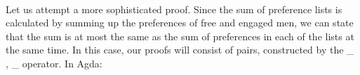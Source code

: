 {\begin{code}
\>[0]%
\>[1476I]\AgdaSymbol{(}\AgdaSpace{}%
\AgdaOperator{\AgdaInductiveConstructor{,}}\AgdaSpace{}%
\AgdaInductiveConstructor{[]}\AgdaSymbol{)}\<%
\\
\>[.][@{}l@{}]\<[1476I]%
\>[20]\AgdaSymbol{((}\AgdaSpace{}%
\AgdaOperator{\AgdaInductiveConstructor{,}}\AgdaSpace{}%
\AgdaSpace{}%
\AgdaSpace{}%
\AgdaSymbol{)}\AgdaSpace{}%
\AgdaSpace{}%
\AgdaSymbol{)}\<%
\\
%
\>[20]\AgdaSpace{}%
\AgdaSymbol{=}\AgdaSpace{}%
\AgdaSpace{}%
\AgdaSpace{}%
\AgdaSymbol{(}\AgdaSpace{}%
\AgdaSymbol{(}\AgdaSpace{}%
\AgdaSymbol{((}\AgdaSpace{}%
\AgdaOperator{\AgdaInductiveConstructor{,}}\AgdaSpace{}%
\AgdaSymbol{)}\AgdaSpace{}%
\AgdaSpace{}%
\AgdaSymbol{)))}\<%
\\
\>[0]%
\>[1495I]\AgdaSymbol{(}\AgdaSpace{}%
\AgdaOperator{\AgdaInductiveConstructor{,}}\AgdaSpace{}%
\AgdaSpace{}%
\AgdaSpace{}%
\AgdaSymbol{)}\<%
\\
\>[.][@{}l@{}]\<[1495I]%
\>[20]\AgdaSymbol{((}\AgdaSpace{}%
\AgdaOperator{\AgdaInductiveConstructor{,}}\AgdaSpace{}%
\AgdaSpace{}%
\AgdaSpace{}%
\AgdaSymbol{)}\AgdaSpace{}%
\AgdaSpace{}%
\AgdaSymbol{)}\<%
\\
%
\>[20]\AgdaSpace{}%
\AgdaSymbol{=}\AgdaSpace{}%
\AgdaSpace{}%
\AgdaSymbol{(}\AgdaSpace{}%
\AgdaSymbol{(}\AgdaSpace{}%
\AgdaSpace{}%
\AgdaOperator{\AgdaPrimitive{+}}\AgdaSpace{}%
\AgdaSpace{}%
\AgdaSymbol{))}\AgdaSpace{}%
\AgdaSpace{}%
\AgdaSymbol{(}\AgdaSpace{}%
\AgdaSymbol{)}\<%
\\
\>[0]\<%
\end{code}

Let us attempt a more sophisticated proof. Since the sum of preference lists is calculated by summing up the preferences of free and engaged men, we can state that the sum is at most the same as the sum of preferences in each of the lists at the same time. In this case, our proofs will consist of pairs, constructed by the \_ , \_ operator. In Agda:

}
